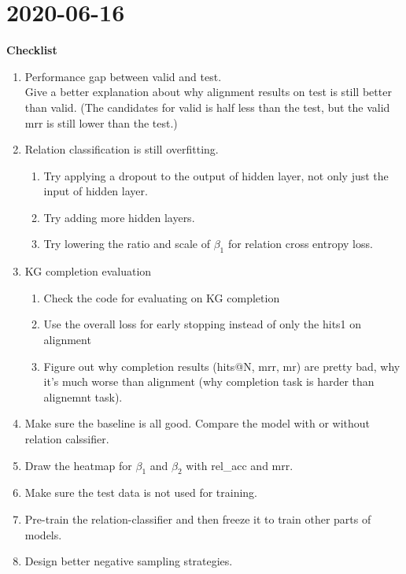 \chapter{2020-06-16}
\textbf{Checklist}
\begin{enumerate}
    \item \faCheckSquareO Performance gap between valid and test. \\ 
    Give a better explanation about why alignment results on test is still better than valid. (The candidates for valid is half less than the test, but the valid mrr is still lower than the test.)

    \item \faTimesCircleO Relation classification is still overfitting.
    \begin{enumerate}
        \item \faCheckSquareO Try applying a dropout to the output of hidden layer, not only just the input of hidden layer.
        \item \faCheckSquareO Try adding more hidden layers.
        \item \faCheckSquareO Try lowering the ratio and scale of $\beta_1$ for relation cross entropy loss.  
    \end{enumerate}

    \item KG completion evaluation 
     \begin{enumerate}
        \item \faCheckSquareO Check the code for evaluating on KG completion
        \item \faCheckSquareO Use the overall loss for early stopping instead of only the hits1 on alignment
        \item \faCheckSquareO Figure out why completion results (hits@N, mrr, mr) are pretty bad, why it's much worse than alignment (why completion task is harder than alignemnt task).
    \end{enumerate}

    \item \faCheckSquareO Make sure the baseline is all good. Compare the model with or without relation calssifier.
    \item Draw the heatmap for $\beta_1$ and $\beta_2$ with rel\_acc and mrr.
    \item \faCheckSquareO Make sure the test data is not used for training.
    \item Pre-train the relation-classifier and then freeze it to train other parts of models. 
    \item Design better negative sampling strategies. 
\end{enumerate}

